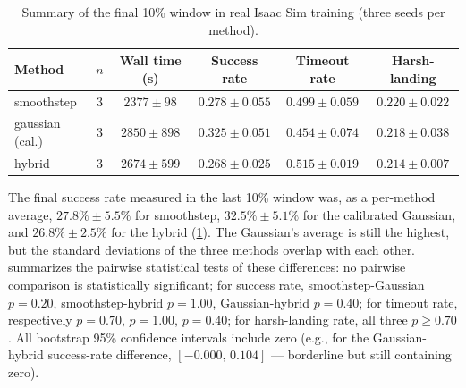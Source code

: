 \begin{table}[t]
\centering
\caption{Summary of the final 10\% window in real Isaac Sim training
(three seeds per method).}
\label{tab:training}
\footnotesize
\begin{tabular}{@{}lccccc@{}}
\toprule
\textbf{Method} & \textbf{$n$} & \textbf{Wall time (s)} & \textbf{Success rate} & \textbf{Timeout rate} & \textbf{Harsh-landing} \\
\midrule
smoothstep & 3 & $2377\pm 98$ & $0.278\pm 0.055$ & $0.499\pm 0.059$ & $0.220\pm 0.022$ \\
gaussian (cal.) & 3 & $2850\pm 898$ & $0.325\pm 0.051$ & $0.454\pm 0.074$ & $0.218\pm 0.038$ \\
hybrid & 3 & $2674\pm 599$ & $0.268\pm 0.025$ & $0.515\pm 0.019$ & $0.214\pm 0.007$ \\
\bottomrule
\end{tabular}
\end{table}

The final success rate measured in the last 10\% window was, as a
per-method average, $27.8\%\pm 5.5\%$ for smoothstep,
$32.5\%\pm 5.1\%$ for the calibrated Gaussian, and $26.8\%\pm 2.5\%$ for
the hybrid (\cref{tab:training}). The Gaussian's average is still the
highest, but the standard deviations of the three methods overlap with
each other.  summarizes the pairwise statistical
tests of these differences: no pairwise comparison is statistically
significant; for success rate, smoothstep-Gaussian $p=0.20$,
smoothstep-hybrid $p=1.00$, Gaussian-hybrid $p=0.40$; for timeout rate,
respectively $p=0.70$, $p=1.00$, $p=0.40$; for harsh-landing rate, all
three $p\ge 0.70$. All bootstrap 95\% confidence intervals include zero
(e.g., for the Gaussian-hybrid success-rate difference,
$[-0.000,\,0.104]$ --- borderline but still containing zero).

